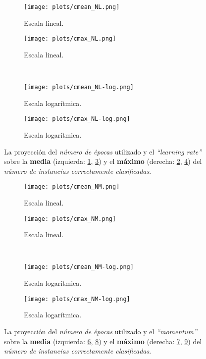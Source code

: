 
\begin{figure}[h]
	\centering
	\begin{subfigure}[b]{0.49\textwidth}
        \texttt{[image: plots/cmean\_NL.png]}
        \caption{Escala lineal.}
        \label{fig:cmean_NL-lin}
    \end{subfigure}
	\begin{subfigure}[b]{0.49\textwidth}
        \texttt{[image: plots/cmax\_NL.png]}
        \caption{Escala lineal.}
        \label{fig:cmax_NL-lin}
    \end{subfigure}
    \\
	\begin{subfigure}[b]{0.49\textwidth}
        \texttt{[image: plots/cmean\_NL-log.png]}
        \caption{Escala logarítmica.}
        \label{fig:cmean_NL-log}
    \end{subfigure}
	\begin{subfigure}[b]{0.49\textwidth}
        \texttt{[image: plots/cmax\_NL-log.png]}
        \caption{Escala logarítmica.}
        \label{fig:cmax_NL-log}
    \end{subfigure}    
	
	\caption{La proyección del \emph{número de épocas} utilizado y el \emph{``learning rate''} 
			 sobre la \textbf{media} (izquierda: \ref{fig:cmean_NL-lin}, \ref{fig:cmean_NL-log})
			 y el \textbf{máximo} (derecha: \ref{fig:cmax_NL-lin}, \ref{fig:cmax_NL-log})
			 del \emph{número de instancias correctamente clasificadas}. 
			}
	\label{fig:NL}
\end{figure}


\begin{figure}[h]
	\centering
	\begin{subfigure}[b]{0.49\textwidth}
        \texttt{[image: plots/cmean\_NM.png]}
        \caption{Escala lineal.}
        \label{fig:cmean_NM-lin}
    \end{subfigure}
	\begin{subfigure}[b]{0.49\textwidth}
        \texttt{[image: plots/cmax\_NM.png]}
        \caption{Escala lineal.}
        \label{fig:cmax_NM-lin}
    \end{subfigure}
    \\
	\begin{subfigure}[b]{0.49\textwidth}
        \texttt{[image: plots/cmean\_NM-log.png]}
        \caption{Escala logarítmica.}
        \label{fig:cmean_NM-log}
    \end{subfigure}
	\begin{subfigure}[b]{0.49\textwidth}
        \texttt{[image: plots/cmax\_NM-log.png]}
        \caption{Escala logarítmica.}
        \label{fig:cmax_NM-log}
    \end{subfigure}    
	
	\caption{La proyección del \emph{número de épocas} utilizado y el \emph{``momentum''} 
			 sobre la \textbf{media} 
			 (izquierda: \ref{fig:cmean_NM-lin}, \ref{fig:cmean_NM-log}) 
			 y el \textbf{máximo} (derecha: \ref{fig:cmax_NM-lin}, \ref{fig:cmax_NM-log})
			 del \emph{número de instancias correctamente clasificadas}. }
	\label{fig:NM}
\end{figure}

